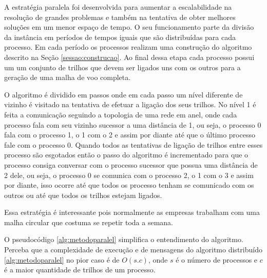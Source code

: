 A estratégia paralela foi desenvolvida para aumentar a escalabilidade na
resolução de grandes problemas e também na tentativa de obter melhores soluções
em um menor espaço de tempo. O seu funcionamento parte da divisão da instância
em períodos de tempos iguais que são distribuídas para cada processo. Em cada
período os processos realizam uma construção do algoritmo descrito na Seção
\ref{sessao:construcao}. Ao final dessa etapa cada processo possui um um
conjunto de trilhos que devem ser ligados uns com os outros para a geração de
uma malha de voo completa.
 
O algoritmo é dividido em passos onde em cada passo um
nível diferente de vizinho é visitado na tentativa de efetuar a ligação dos seus
trilhos. No nível 1 é feita a comunicação seguindo a topologia de uma
rede em anel, onde cada processo fala com seu vizinho sucessor a uma distância
de 1, ou seja, o processo 0 fala com o processo 1, o 1 com o 2 e assim por
diante até que o último processo fale com o processo 0. Quando todos as tentativas de
ligação de trilhos entre esses processo são esgotados então o passo do algoritmo
é incrementado para que o processo consiga conversar com o processo sucessor que
possua uma distância de 2 dele, ou seja, o processo 0 se comunica com o processo
2, o 1 com o 3 e assim por diante, isso ocorre até que todos os processo tenham
se comunicado com os outros ou até que todos os trilhos estejam ligados.

Essa estratégia é interessante pois normalmente as empresas trabalham com uma
malha circular que costuma se repetir toda a semana.

O pseudocódigo \ref{alg:metodoparalel} simplifica o entendimento do algoritmo.
Perceba que a complexidade de execução e de mensagens do algoritmo distribuído
\ref{alg:metodoparalel} no pior caso é de $O(s.c)$, onde $s$ é o número de
processos e $c$ é a maior quantidade de trilhos de um processo.


